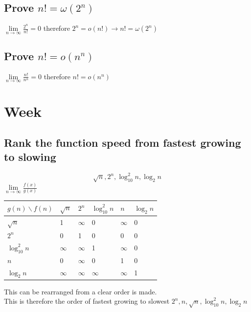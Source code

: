 \documentclass[12pt, a4paper]{article}
\begin{document}
			\subsection{Prove $n!=\omega (2^n)$}
				$\lim\limits_{n\rightarrow \infty}\frac{2^n}{n!}=0$ therefore $2^n = o(n!) \rightarrow n!=\omega (2^n)$				
			\subsection{Prove $n!=o(n^n)$}
				$\lim\limits_{n\rightarrow \infty}\frac{n!}{n^n}=0$ therefore $n! = o(n^n) $	
		\section{Week}
			\subsection{Rank the function speed from fastest growing to slowing}
				$$\sqrt{n},2^n,\log_{10}^2n,\log_2n$$
				$\lim\limits_{n\rightarrow \infty}\frac{f(x)}{g(x)}$\\
				\clearpage
				\begin{table}[h!]
					\begin{tabular}{|l|l|l|l|l|l|}
					\hline
					$g(n)\backslash f(n)$     & $\sqrt{n}$ & $2^n$    & $\log_{10}^2n$ & $n$      & $\log_2n$ \\ \hline
					$\sqrt{n}$     & 1          & $\infty$ & 0              & $\infty$ & 0         \\ \hline
					$2^n$          & 0          & 1        & 0              & 0        & 0         \\ \hline
					$\log_{10}^2n$ & $\infty$   & $\infty$ & 1              & $\infty$ & 0         \\ \hline
					$n$            & 0          & $\infty$ & 0              & 1        & 0         \\ \hline
					$\log_2n$      & $\infty$   & $\infty$ & $\infty$       & $\infty$ & 1         \\ \hline
					\end{tabular}
				\end{table}
				This can be rearranged from a clear order is made.\\
				This is therefore the order of fastest growing to slowest $2^n,n,\sqrt{n},\log_{10}^2n,\log_2n$\\
\end{document}
